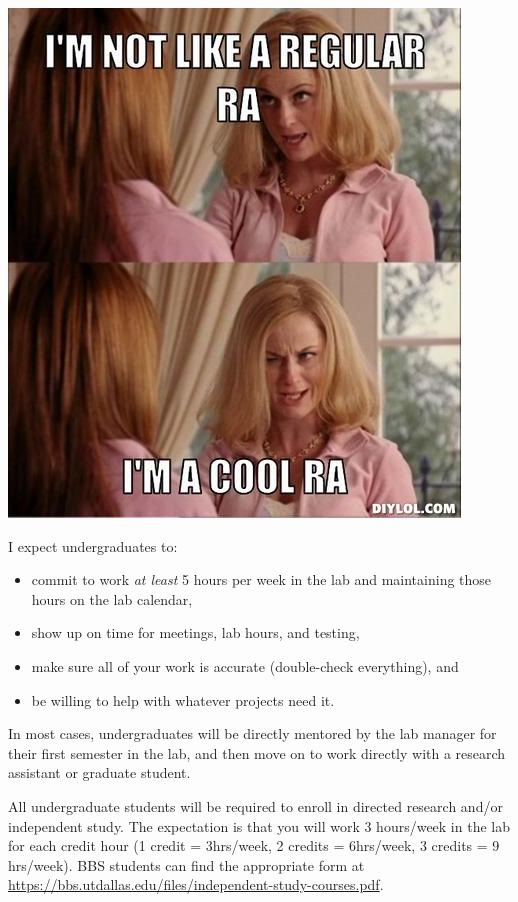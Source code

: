 \documentclass[
]{book}
\providecommand{\tightlist}{%
  \setlength{\itemsep}{0pt}\setlength{\parskip}{0pt}}
\begin{document}
\includegraphics{images/RAmeme.jpg}

I expect undergraduates to:

\begin{itemize}
\tightlist
\item
  commit to work \emph{at least} 5 hours per week in the lab and maintaining those hours on the lab calendar,
\item
  show up on time for meetings, lab hours, and testing,\\
\item
  make sure all of your work is accurate (double-check everything), and
\item
  be willing to help with whatever projects need it.
\end{itemize}

In most cases, undergraduates will be directly mentored by the lab manager for their first semester in the lab, and then move on to work directly with a research assistant or graduate student.

All undergraduate students will be required to enroll in directed research and/or independent study. The expectation is that you will work 3 hours/week in the lab for each credit hour (1 credit = 3hrs/week, 2 credits = 6hrs/week, 3 credits = 9 hrs/week). BBS students can find the appropriate form at \url{https://bbs.utdallas.edu/files/independent-study-courses.pdf}.
\end{document}
